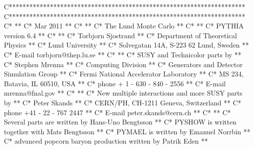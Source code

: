 \eatline
\nwendcode{}\nwdocspar
\nwenddocs{}\endmoddef
C*********************************************************************
C*********************************************************************
C*                                                                  **
C*                                                       Mar 2011   **
C*                                                                  **
C*                       The Lund Monte Carlo                       **
C*                                                                  **
C*                        PYTHIA version 6.4                        **
C*                                                                  **
C*                        Torbjorn Sjostrand                        **
C*                 Department of Theoretical Physics                **
C*                         Lund University                          **
C*               Solvegatan 14A, S-223 62 Lund, Sweden              **
C*                    E-mail torbjorn@thep.lu.se                    **
C*                                                                  **
C*                  SUSY and Technicolor parts by                   **
C*                         Stephen Mrenna                           **
C*                       Computing Division                         **
C*            Generators and Detector Simulation Group              **
C*              Fermi National Accelerator Laboratory               **
C*                 MS 234, Batavia, IL  60510, USA                  **
C*                   phone + 1 - 630 - 840 - 2556                   **
C*                      E-mail mrenna@fnal.gov                      **
C*                                                                  **
C*         New multiple interactions and more SUSY parts by         **
C*                          Peter Skands                            **
C*               CERN/PH, CH-1211 Geneva, Switzerland               **
C*                    phone +41 - 22 - 767 2447                     **
C*                   E-mail peter.skands@cern.ch                    **
C*                                                                  **
C*         Several parts are written by Hans-Uno Bengtsson          **
C*          PYSHOW is written together with Mats Bengtsson          **
C*               PYMAEL is written by Emanuel Norrbin               **
C*     advanced popcorn baryon production written by Patrik Eden    **
